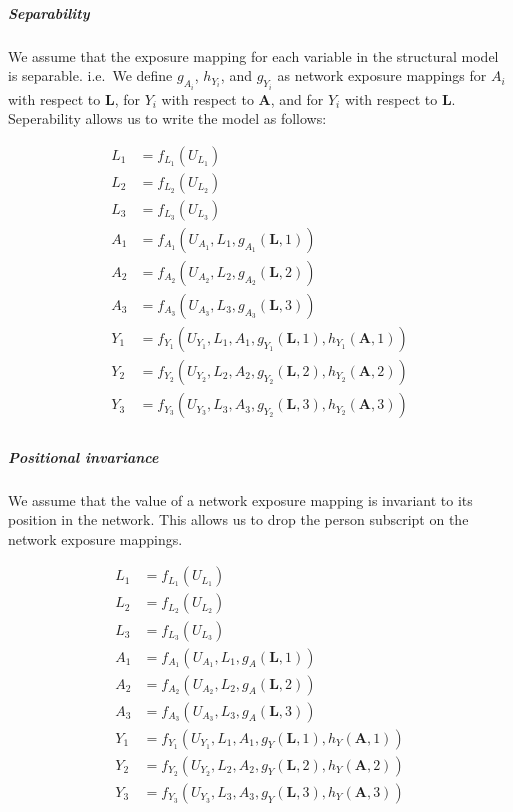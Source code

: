 \documentclass[
  letterpaper,
  DIV=11,
  numbers=noendperiod,
  oneside]{scrreprt}
\let\oldsubparagraph\subparagraph
\renewcommand{\subparagraph}[1]{\oldsubparagraph{#1}\mbox{}}
\begin{document}
\hypertarget{separability}{%
\subparagraph{Separability}\label{separability}}

We assume that the exposure mapping for each variable in the structural
model is separable. i.e.~We define \(g_{A_i}\), \(h_{Y_i}\), and
\(g_{Y_i}\) as network exposure mappings for \(A_i\) with respect to
\(\mathbf{L}\), for \(Y_i\) with respect to \(\mathbf{A}\), and for
\(Y_i\) with respect to \(\mathbf{L}\). Seperability allows us to write
the model as follows:

\[
\begin{aligned}
L_1 &= f_{L_1}(U_{L_1}) \\
L_2 &= f_{L_2}(U_{L_2}) \\
L_3 &= f_{L_3}(U_{L_3} ) \\
A_1 &= f_{A_1}(U_{A_1}, L_1, g_{A_1}(\mathbf{L}, 1)) \\
A_2 &= f_{A_2}(U_{A_2}, L_2, g_{A_2}(\mathbf{L}, 2)) \\
A_3 &= f_{A_3}(U_{A_3}, L_3, g_{A_3}(\mathbf{L}, 3)) \\
Y_1 &= f_{Y_1}(U_{Y_1}, L_1, A_1, g_{Y_1}(\mathbf{L}, 1), h_{Y_1}(\mathbf{A}, 1)) \\
Y_2 &= f_{Y_2}(U_{Y_2}, L_2, A_2, g_{Y_2}(\mathbf{L}, 2), h_{Y_2}(\mathbf{A}, 2)) \\
Y_3 &= f_{Y_3}(U_{Y_3}, L_3,A_3,  g_{Y_2}(\mathbf{L}, 3), h_{Y_2}(\mathbf{A}, 3)) \\
\end{aligned}
\]

\hypertarget{positional-invariance}{%
\subparagraph{Positional invariance}\label{positional-invariance}}

We assume that the value of a network exposure mapping is invariant to
its position in the network. This allows us to drop the person subscript
on the network exposure mappings.

\[
\begin{aligned}
L_1 &= f_{L_1}(U_{L_1}) \\
L_2 &= f_{L_2}(U_{L_2}) \\
L_3 &= f_{L_3}(U_{L_3} ) \\
A_1 &= f_{A_1}(U_{A_1}, L_1, g_{A}(\mathbf{L}, 1)) \\
A_2 &= f_{A_2}(U_{A_2}, L_2, g_{A}(\mathbf{L}, 2)) \\
A_3 &= f_{A_3}(U_{A_3}, L_3, g_{A}(\mathbf{L}, 3)) \\
Y_1 &= f_{Y_1}(U_{Y_1}, L_1, A_1, g_{Y}(\mathbf{L}, 1), h_{Y}(\mathbf{A}, 1)) \\
Y_2 &= f_{Y_2}(U_{Y_2}, L_2, A_2, g_{Y}(\mathbf{L}, 2), h_{Y}(\mathbf{A}, 2)) \\
Y_3 &= f_{Y_3}(U_{Y_3}, L_3,A_3,  g_{Y}(\mathbf{L}, 3), h_{Y}(\mathbf{A}, 3)) \\
\end{aligned}
\]
\end{document}
